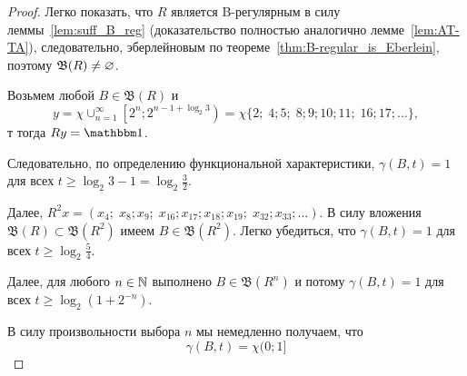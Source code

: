 \begin{proof}
	Легко показать, что $R$ является B-регулярным
	в силу леммы~\ref{lem:suff_B_reg} (доказательство полностью аналогично лемме~\ref{lem:AT-TA}),
    следовательно, эберлейновым по теореме~\ref{thm:B-regular_is_Eberlein},
    поэтому $\mathfrak{B}(R)\ne \varnothing$.

    Возьмем любой $B \in \mathfrak{B}(R)$ и
    \begin{equation}
        y = \chi \cup_{n=1}^\infty \left\lbrack 2^n; 2^{n-1+\log_2 3}\right) =
        \chi \{ 2; \; 4;5; \; 8;9;10;11; \; 16;17;... \}
        ,
    \end{equation}
    т тогда $Ry=\one$.

	Следовательно, по определению функциональной характеристики,
	$\gamma(B,t) = 1$ для всех $t \geq \log_2 3 - 1 = \log_2 \frac32$.

	Далее, $R^2 x = (x_4; \; x_8; x_9;\; x_{16}; x_{17}; x_{18}; x_{19}; \; x_{32}; x_{33};...)$.
	В силу вложения $\mathfrak{B}(R)\subset\mathfrak{B}(R^2)$
	имеем $B\in\mathfrak{B}(R^2)$.
	Легко убедиться, что $\gamma(B,t) = 1$ для всех $t \geq \log_2 \frac54$.

	Далее, для любого $n\in\mathbb{N}$ выполнено $B\in\mathfrak{B}(R^n)$
	и потому
	$\gamma(B,t) = 1$ для всех $t \geq \log_2 (1+2^{-n})$.

	В силу произвольности выбора $n$ мы немедленно получаем, что
	\begin{equation}
		\label{eq:gamma_chi_0_1}
		\gamma(B,t) = \chi{(}0;1{]}
	\end{equation}



\end{proof}
